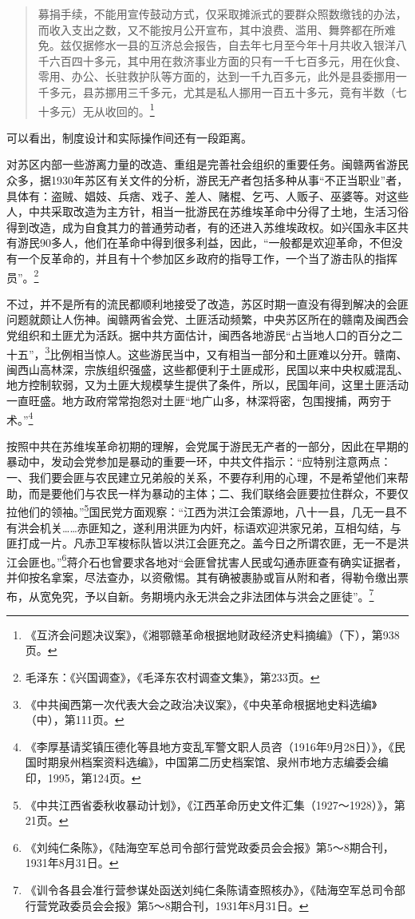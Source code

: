 \begin{quote}

募捐手续，不能用宣传鼓动方式，仅采取摊派式的要群众照数缴钱的办法，而收入支出之数，又不能按月公开宣布，其中浪费、滥用、舞弊都在所难免。兹仅据修水一县的互济总会报告，自去年七月至今年十月共收入银洋八千六百四十多元，其中用在救济事业方面的只有一千七百多元，用在伙食、零用、办公、长驻救护队等方面的，达到一千九百多元，此外是县委挪用一千多元，县苏挪用三千多元，尤其是私人挪用一百五十多元，竟有半数（七十多元）无从收回的。\footnote{《互济会问题决议案》，《湘鄂赣革命根据地财政经济史料摘编》（下），第938页。}
\end{quote}


可以看出，制度设计和实际操作间还有一段距离。


对苏区内部一些游离力量的改造、重组是完善社会组织的重要任务。闽赣两省游民众多，据1930年苏区有关文件的分析，游民无产者包括多种从事“不正当职业”者，具体有：盗贼、娼妓、兵痞、戏子、差人、赌棍、乞丐、人贩子、巫婆等。对这些人，中共采取改造为主方针，相当一批游民在苏维埃革命中分得了土地，生活习俗得到改造，成为自食其力的普通劳动者，有的还进入苏维埃政权。如兴国永丰区共有游民90多人，他们在革命中得到很多利益，因此，“一般都是欢迎革命，不但没有一个反革命的，并且有十个参加区乡政府的指导工作，一个当了游击队的指挥员”。\footnote{毛泽东：《兴国调查》，《毛泽东农村调查文集》，第233页。}


不过，并不是所有的流民都顺利地接受了改造，苏区时期一直没有得到解决的会匪问题就颇让人伤神。闽赣两省会党、土匪活动频繁，中央苏区所在的赣南及闽西会党组织和土匪尤为活跃。据中共方面估计，闽西各地游民“占当地人口的百分之二十五”，\footnote{《中共闽西第一次代表大会之政治决议案》，《中央革命根据地史料选编》（中），第111页。}比例相当惊人。这些游民当中，又有相当一部分和土匪难以分开。赣南、闽西山高林深，宗族组织强盛，这些都便利于土匪成形，民国以来中央权威混乱、地方控制软弱，又为土匪大规模孳生提供了条件，所以，民国年间，这里土匪活动一直旺盛。地方政府常常抱怨对土匪“地广山多，林深将密，包围搜捕，两穷于术。”\footnote{《李厚基请奖镇压德化等县地方变乱军警文职人员咨（1916年9月28日）》，《民国时期泉州档案资料选编》，中国第二历史档案馆、泉州市地方志编委会编印，1995，第124页。}


按照中共在苏维埃革命初期的理解，会党属于游民无产者的一部分，因此在早期的暴动中，发动会党参加是暴动的重要一环，中共文件指示：“应特别注意两点：一、我们要会匪与农民建立兄弟般的关系，不要存利用的心理，不是希望他们来帮助，而是要他们与农民一样为暴动的主体；二、我们联络会匪要拉住群众，不要仅拉他们的领袖。”\footnote{《中共江西省委秋收暴动计划》，《江西革命历史文件汇集（1927～1928）》，第21页。}国民党方面观察：“江西为洪江会策源地，八十一县，几无一县不有洪会机关……赤匪知之，遂利用洪匪为内奸，标语欢迎洪家兄弟，互相勾结，与匪打成一片。凡赤卫军梭标队皆以洪江会匪充之。盖今日之所谓农匪，无一不是洪江会匪也。”\footnote{《刘纯仁条陈》，《陆海空军总司令部行营党政委员会会报》第5～8期合刊，1931年8月31日。}蒋介石也曾要求各地对“会匪曾扰害人民或勾通赤匪查有确实证据者，并仰按名拿案，尽法查办，以资儆惕。其有确被裹胁或盲从附和者，得勒令缴出票布，从宽免究，予以自新。务期境内永无洪会之非法团体与洪会之匪徒”。\footnote{《训令各县会准行营参谋处函送刘纯仁条陈请查照核办》，《陆海空军总司令部行营党政委员会会报》第5～8期合刊，1931年8月31日。}


